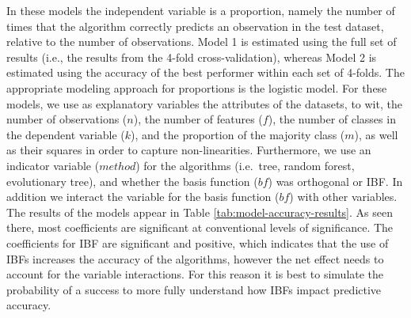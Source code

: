 \documentclass[]{elsarticle} %
\begin{document}
In these models the independent variable is a proportion, namely the
number of times that the algorithm correctly predicts an observation in
the test dataset, relative to the number of observations. Model 1 is
estimated using the full set of results (i.e., the results from the
4-fold cross-validation), whereas Model 2 is estimated using the
accuracy of the best performer within each set of 4-folds. The
appropriate modeling approach for proportions is the logistic model. For
these models, we use as explanatory variables the attributes of the
datasets, to wit, the number of observations (\(n\)), the number of
features (\(f\)), the number of classes in the dependent variable
(\(k\)), and the proportion of the majority class (\(m\)), as well as
their squares in order to capture non-linearities. Furthermore, we use
an indicator variable (\(method\)) for the algorithms (i.e.~tree, random
forest, evolutionary tree), and whether the basis function (\(bf\)) was
orthogonal or IBF. In addition we interact the variable for the basis
function (\(bf\)) with other variables. The results of the models appear
in Table \ref{tab:model-accuracy-results}. As seen there, most
coefficients are significant at conventional levels of significance. The
coefficients for IBF are significant and positive, which indicates that
the use of IBFs increases the accuracy of the algorithms, however the
net effect needs to account for the variable interactions. For this
reason it is best to simulate the probability of a success to more fully
understand how IBFs impact predictive accuracy.
\end{document}
